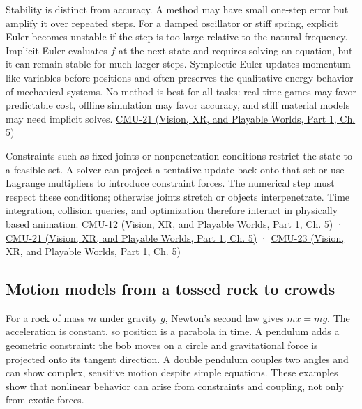 Stability is distinct from accuracy. A method may have small one-step error but amplify it over repeated steps. For a damped oscillator or stiff spring, explicit Euler becomes unstable if the step is too large relative to the natural frequency. Implicit Euler evaluates \(f\) at the next state and requires solving an equation, but it can remain stable for much larger steps. Symplectic Euler updates momentum-like variables before positions and often preserves the qualitative energy behavior of mechanical systems. No method is best for all tasks: real-time games may favor predictable cost, offline simulation may favor accuracy, and stiff material models may need implicit solves. \href{../07-Vision-XR-and-Playable-Worlds-P01/main.pdf\#nameddest=04-visual-computing-ii-ch036-cmu-21---dynamics-and-time-integration}{CMU-21 (Vision, XR, and Playable Worlds, Part 1, Ch. 5)}

Constraints such as fixed joints or nonpenetration conditions restrict the state to a feasible set. A solver can project a tentative update back onto that set or use Lagrange multipliers to introduce constraint forces. The numerical step must respect these conditions; otherwise joints stretch or objects interpenetrate. Time integration, collision queries, and optimization therefore interact in physically based animation. \href{../07-Vision-XR-and-Playable-Worlds-P01/main.pdf\#nameddest=04-visual-computing-ii-ch036-cmu-12---geometric-queries}{CMU-12 (Vision, XR, and Playable Worlds, Part 1, Ch. 5)} · \href{../07-Vision-XR-and-Playable-Worlds-P01/main.pdf\#nameddest=04-visual-computing-ii-ch036-cmu-21---dynamics-and-time-integration}{CMU-21 (Vision, XR, and Playable Worlds, Part 1, Ch. 5)} · \href{../07-Vision-XR-and-Playable-Worlds-P01/main.pdf\#nameddest=04-visual-computing-ii-ch036-cmu-23---physically-based-animation-and-pdes}{CMU-23 (Vision, XR, and Playable Worlds, Part 1, Ch. 5)}

\subsection{Motion models from a tossed rock to crowds}\label{04-visual-computing-ii-ch029-motion-models-from-a-tossed-rock-to-crowds}

\hypertarget{04-visual-computing-ii-ch029-motion-models-from-a-tossed-rock-to-crowds}{}

For a rock of mass \(m\) under gravity \(g\), Newton's second law gives \(m\ddot x=mg\). The acceleration is constant, so position is a parabola in time. A pendulum adds a geometric constraint: the bob moves on a circle and gravitational force is projected onto its tangent direction. A double pendulum couples two angles and can show complex, sensitive motion despite simple equations. These examples show that nonlinear behavior can arise from constraints and coupling, not only from exotic forces.

